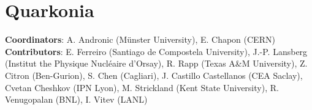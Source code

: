 \documentclass[../report.tex]{subfiles}
\begin{document}
\section{Quarkonia}

\label{sec:quarkonia}

\textbf{Coordinators}: A. Andronic (M\"{u}nster University), E. Chapon (CERN)
\linebreak
\textbf{Contributors}: 
E. Ferreiro (Santiago de Compostela University), J.-P. Lansberg (Institut the Physique Nucl\'{e}aire d'Orsay), R. Rapp (Texas A\&M University),
Z. Citron (Ben-Gurion), S. Chen (Cagliari),
J. Castillo Castellanos (CEA Saclay),
Cvetan Cheshkov (IPN Lyon),
M. Strickland (Kent State University), R. Venugopalan (BNL), I. Vitev (LANL)


\end{document}
